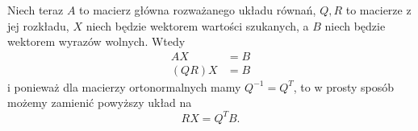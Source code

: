 Niech teraz $A$ to macierz główna rozważanego układu równań, $Q,R$ to macierze z jej rozkładu, $X$ niech będzie wektorem wartości szukanych, a $B$ niech będzie wektorem wyrazów wolnych. Wtedy
\begin{align*}
    AX&=B\\
    (QR)X&=B
\end{align*}
i ponieważ dla macierzy ortonormalnych mamy $Q^{-1}=Q^T$, to w prosty sposób możemy zamienić powyższy układ na
$$RX=Q^TB.$$